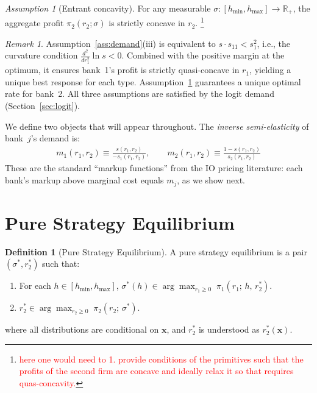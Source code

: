 \documentclass[12pt]{article}
\theoremstyle{plain}
\theoremstyle{plain}
\theoremstyle{definition}  %
\newtheorem{definition}[thm]{Definition}  %
\theoremstyle{remark}  %
\newtheorem{remark}[thm]{Remark}  %
\newtheorem{ass}[thm]{Assumption}
\begin{document}
\begin{ass}[Entrant concavity]\label{ass:pi2conc}
For any measurable $\sigma: [h_{\min}, h_{\max}] \to \mathbb{R}_+$, the aggregate profit $\pi_2(r_2; \sigma)$ is strictly concave in $r_2$. \footnote{\textcolor{red}{here one would need to 1. provide conditions of the primitives such that the profits of the second firm are concave and ideally relax it so that requires quas-concavity.}}
\end{ass}

\begin{remark}
Assumption~\ref{ass:demand}(iii) is equivalent to $s \cdot s_{11} < s_1^2$, i.e., the curvature condition $\frac{d^2}{dr_1^2}\ln s < 0$. Combined with the positive margin at the optimum, it ensures bank~1's profit is strictly quasi-concave in $r_1$, yielding a unique best response for each type. Assumption~\ref{ass:pi2conc} guarantees a unique optimal rate for bank~2. All three assumptions are satisfied by the logit demand (Section~\ref{sec:logit}).
\end{remark}

We define two objects that will appear throughout. The \emph{inverse semi-elasticity} of bank~$j$'s demand is:
\begin{align}\label{eq:markup_def}
    m_1(r_1, r_2) \equiv \frac{s(r_1, r_2)}{-s_1(r_1, r_2)}, \qquad m_2(r_1, r_2) \equiv \frac{1 - s(r_1, r_2)}{s_2(r_1, r_2)}
\end{align}
These are the standard ``markup functions'' from the IO pricing literature: each bank's markup above marginal cost equals $m_j$, as we show next.



\section{Pure Strategy Equilibrium}\label{sec:eq}

\begin{definition}[Pure Strategy Equilibrium]
A pure strategy equilibrium is a pair $(\sigma^*, r_2^*)$ such that:
\begin{enumerate}
    \item For each $h \in [h_{\min}, h_{\max}]$, \; $\sigma^*(h) \in \displaystyle\arg\max_{r_1 \geq 0} \; \pi_1(r_1;\, h,\, r_2^*)$.
    \item $r_2^*  \in \displaystyle\arg\max_{r_2 \geq 0} \; \pi_2(r_2;\, \sigma^*)$.
\end{enumerate}
where all distributions are conditional on $\mathbf{x}$, and $r_2^*$ is understood as $r_2^*(\mathbf{x})$.
\end{definition}
\end{document}
